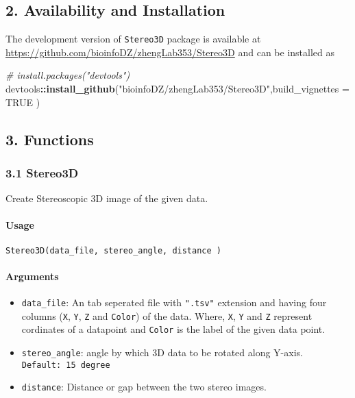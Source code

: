 \documentclass[]{article}
\newenvironment{Shaded}{\begin{snugshade}}{\end{snugshade}}
\newcommand{\KeywordTok}[1]{\textcolor[rgb]{0.13,0.29,0.53}{\textbf{#1}}}
\newcommand{\DataTypeTok}[1]{\textcolor[rgb]{0.13,0.29,0.53}{#1}}
\newcommand{\StringTok}[1]{\textcolor[rgb]{0.31,0.60,0.02}{#1}}
\newcommand{\CommentTok}[1]{\textcolor[rgb]{0.56,0.35,0.01}{\textit{#1}}}
\newcommand{\OtherTok}[1]{\textcolor[rgb]{0.56,0.35,0.01}{#1}}
\newcommand{\OperatorTok}[1]{\textcolor[rgb]{0.81,0.36,0.00}{\textbf{#1}}}
\newcommand{\NormalTok}[1]{#1}
\providecommand{\tightlist}{%
  \setlength{\itemsep}{0pt}\setlength{\parskip}{0pt}}
\let\oldparagraph\paragraph
\renewcommand{\paragraph}[1]{\oldparagraph{#1}\mbox{}}
\begin{document}
\subsection{2. Availability and
Installation}\label{availability-and-installation}

The development version of \texttt{Stereo3D} package is available at
\url{https://github.com/bioinfoDZ/zhengLab353/Stereo3D} and can be
installed as

\begin{Shaded}
\begin{Highlighting}[]
\CommentTok{# install.packages("devtools")}
\NormalTok{devtools}\OperatorTok{::}\KeywordTok{install_github}\NormalTok{(}\StringTok{"bioinfoDZ/zhengLab353/Stereo3D"}\NormalTok{,}\DataTypeTok{build_vignettes =} \OtherTok{TRUE}\NormalTok{ )}
\end{Highlighting}
\end{Shaded}

\subsection{3. Functions}\label{functions}

\subsubsection{3.1 Stereo3D}\label{stereo3d}

Create Stereoscopic 3D image of the given data.

\paragraph{\texorpdfstring{\textbf{Usage}}{Usage}}\label{usage}

\texttt{Stereo3D(data\_file,\ stereo\_angle,\ distance\ )}

\paragraph{\texorpdfstring{\textbf{Arguments
}}{Arguments }}\label{arguments}

\begin{itemize}
\tightlist
\item
  \texttt{data\_file}: An tab seperated file with \texttt{".tsv"}
  extension and having four columns (\texttt{X}, \texttt{Y}, \texttt{Z}
  and \texttt{Color}) of the data. Where, \texttt{X}, \texttt{Y} and
  \texttt{Z} represent cordinates of a datapoint and \texttt{Color} is
  the label of the given data point.
\item
  \texttt{stereo\_angle}: angle by which 3D data to be rotated along
  Y-axis. \texttt{Default:\ 15\ degree}
\item
  \texttt{distance}: Distance or gap between the two stereo images.
\end{itemize}
\end{document}
